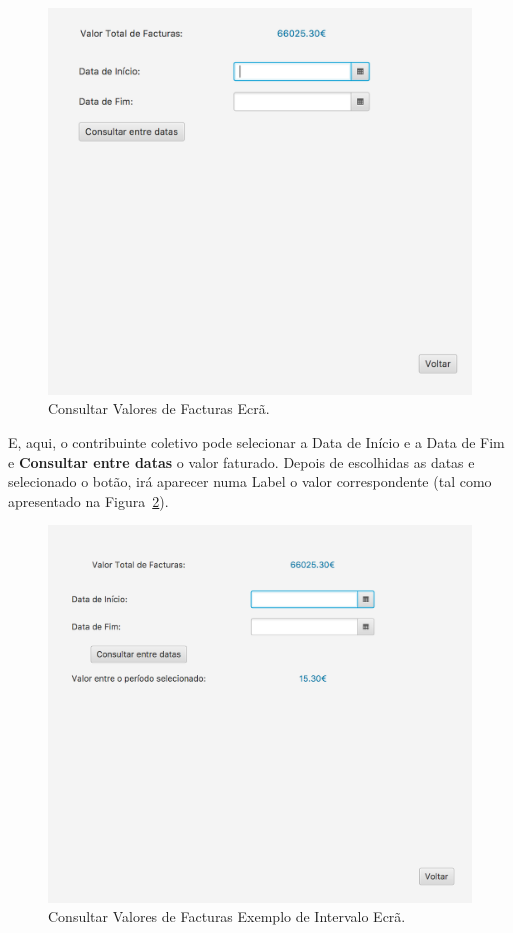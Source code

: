 \documentclass[a4paper]{article}
\begin{document}
\begin{itemize}
\begin{figure}[H]
\centering
\includegraphics[scale=0.35]{imgs/totalFacturadoScreen.png}
\caption{Consultar Valores de Facturas Ecrã.}
\label{img:totalFacturadoScreen}
\end{figure}

E, aqui, o contribuinte coletivo pode selecionar a Data de Início e a Data
de Fim e \textbf{Consultar entre datas} o valor faturado. Depois de escolhidas
as datas e selecionado o botão, irá aparecer
numa Label o valor correspondente
(tal como apresentado na Figura~\ref{img:totalFacturaIntervaloScreen}).

\begin{figure}[H]
\centering
\includegraphics[scale=0.35]{imgs/totalFacturaIntervaloScreen.png}
\caption{Consultar Valores de Facturas Exemplo de Intervalo Ecrã.}
\label{img:totalFacturaIntervaloScreen}
\end{figure}



\end{itemize}
\end{document}
